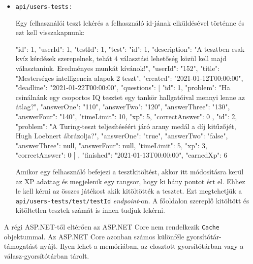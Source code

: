 \begin{itemize}[label={$\bullet$}, topsep=0pt, itemsep=0pt, leftmargin=15pt]
    \item[] {\nolinkurl{api/users-tests:}}
          \begin{addmargin}[\parindent]{0pt}
            Egy felhasználói teszt lekérés a felhasználó id-jának elküldésével történne és ezt kell visszakapnunk:
              \begin{json}
{
    "id": 1,
    "userId": 1,
    "testId": 1,
    "test": {
        "id": 1,
        "description": "A tesztben csak kvíz kérdések szerepelnek, tehát 4 választási lehetőség közül kell majd választaniuk. Eredményes munkát kívánok!",
        "userId": "152",
        "title": "Mesterséges intelligencia alapok 2 teszt",
        "created": "2021-01-12T00:00:00",
        "deadline": "2021-01-22T00:00:00",
        "questions": [
            {
                "id": 1,
                "problem": "Ha csinálnánk egy csoportos IQ tesztet egy tankör hallgatóival mennyi lenne az átlag?",
                "answerOne": "110",
                "answerTwo": "120",
                "answerThree": "130",
                "answerFour": "140",
                "timeLimit": 10,
                "xp": 5,
                "correctAnswer": 0
            },
            {
                "id": 2,
                "problem": "A Turing-teszt teljesítéséért járó arany medál a díj kitűzőjét, Hugh Loebnert ábrázolja?",
                "answerOne": "true",
                "answerTwo": "false",
                "answerThree": null,
                "answerFour": null,
                "timeLimit": 5,
                "xp": 3,
                "correctAnswer": 0
            }
        ]
    },
    "finished": "2021-01-13T00:00:00",
    "earnedXp": 6
}
              \end{json}

              Amikor egy felhasználó befejezi a tesztkitöltést, akkor itt módosításra kerül az XP adattag és megjelenik egy rangsor, hogy ki hány pontot ért el. Ehhez le kell kérni az összes játékost akik kitöltötték a tesztet. Ezt megtehetjük a \nolinkurl{api/users-tests/test/testId} \textit{endpoint}-on. A főoldalon szereplő kitöltött és kitöltetlen tesztek számát is innen tudjuk lekérni.
          \end{addmargin}
\end{itemize}


A régi ASP.NET-től eltérően az ASP.NET Core nem rendelkezik \lstinline{Cache} objektummal. Az ASP.NET Core azonban számos különféle gyorsítótár-támogatást nyújt. Ilyen lehet a memóriában, az elosztott gyorsítótárban vagy a válasz-gyorsítótárban tárolt. \newline

